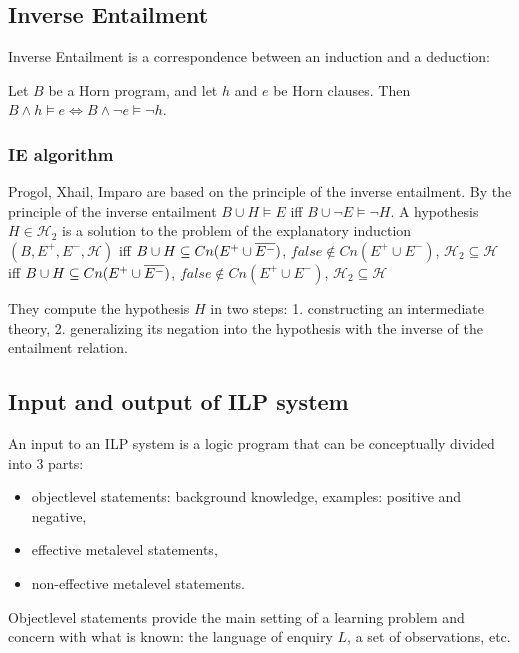 \subsection{Inverse Entailment}
Inverse Entailment is a correspondence between an induction and a deduction:
\begin{thm}\cite{kimber2012learning}
Let $B$ be a Horn program, and let $h$ and $e$ be
Horn clauses. Then $B \wedge h \models e \iff B \wedge \neg e \models \neg h$.
\end{thm}

\subsubsection{IE algorithm\cite{yamamoto2012inverse}}\label{inverse_entailement_algorithm}
Progol, Xhail, Imparo are based on the principle of the inverse entailment. By the principle of the inverse entailment $B \cup H \models E$ iff
$B \cup \neg E \models \neg H$. A hypothesis $H \in \mathcal{H}_2$ is a solution to the problem of the explanatory induction $(B,E^{+},E^{-},\mathcal{H})$ iff
$B \cup H \subseteq Cn(E^{+} \cup \overline{E^{-}})$,
 $false \not\in Cn(E^{+} \cup E^{-})$, $\mathcal{H}_2 \subseteq \mathcal{H}$
iff
$B \cup H \subseteq Cn(E^{+} \cup \overline{E^{-}})$,
 $false \not\in Cn(E^{+} \cup E^{-})$, $\mathcal{H}_2 \subseteq \mathcal{H}$
 
They compute the hypothesis $H$ in two steps:
1. constructing an intermediate theory, 2. generalizing its negation into the hypothesis with the inverse of the entailment relation.

\subsection{Input and output of ILP system}
An input to an ILP system is a logic program that can be conceptually divided into 3 parts:
\begin{itemize}
\item objectlevel statements: background knowledge, examples: positive and negative,
\item effective metalevel statements,
\item non-effective metalevel statements.
\end{itemize}

Objectlevel statements provide the main setting of a learning problem and concern with what is known: the language of enquiry $L$, a set of observations, etc.

